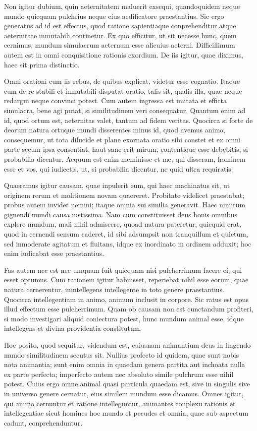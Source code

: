  Non igitur dubium, quin aeternitatem maluerit exsequi, quandoquidem neque mundo quicquam pulchrius neque eius aedificatore praestantius. Sic ergo generatus ad id est effectus, quod ratione sapientiaque conprehenditur atque aeternitate inmutabili continetur. Ex quo efficitur, ut sit necesse hunc, quem cernimus, mundum simulacrum aeternum esse alicuius aeterni. Difficillimum autem est in omni conquisitione rationis exordium. De iis igitur, quae diximus, haec sit prima distinctio.

 Omni orationi cum iis rebus, de quibus explicat, videtur esse cognatio. Itaque cum de re stabili et inmutabili disputat oratio, talis sit, qualis illa, quae neque redargui neque convinci potest. Cum autem ingressa est imitata et efficta simulacra, bene agi putat, si similitudinem veri consequatur. Quantum enim ad id, quod ortum est, aeternitas valet, tantum ad fidem veritas. Quocirca si forte de deorum natura ortuque mundi disserentes minus id, quod avemus animo, consequemur, ut tota dilucide et plane exornata oratio sibi constet et ex omni parte secum ipsa consentiat, haut sane erit mirum, contentique esse debebitis, si probabilia dicentur. Aequum est enim meminisse et me, qui disseram, hominem esse et vos, qui iudicetis, ut, si probabilia dicentur, ne quid ultra requiratis.

 Quaeramus igitur causam, quae inpulerit eum, qui haec machinatus sit, ut originem rerum et molitionem novam quaereret. Probitate videlicet praestabat; probus autem invidet nemini; itaque omnia sui similia generavit. Haec nimirum gignendi mundi causa iustissima. Nam cum constituisset deus bonis omnibus explere mundum, mali nihil admiscere, quoad natura pateretur, quicquid erat, quod in cernendi sensum caderet, id sibi adsumpsit non tranquillum et quietum, sed inmoderate agitatum et fluitans, idque ex inordinato in ordinem adduxit; hoc enim iudicabat esse praestantius.

 Fas autem nec est nec umquam fuit quicquam nisi pulcherrimum facere ei, qui esset optumus. Cum rationem igitur habuisset, reperiebat nihil esse eorum, quae natura cernerentur, inintellegens intellegente in toto genere praestantius. Quocirca intellegentiam in animo, animum inclusit in corpore. Sic ratus est opus illud effectum esse pulcherrimum. Quam ob causam non est cunctandum profiteri, si modo investigari aliquid coniectura potest, hunc mundum animal esse, idque intellegens et divina providentia constitutum.

 Hoc posito, quod sequitur, videndum est, cuiusnam animantium deus in fingendo mundo similitudinem secutus sit. Nullius profecto id quidem, quae sunt nobis nota animantia; sunt enim omnia in quaedam genera partita aut inchoata nulla ex parte perfecta; imperfecto autem nec absoluto simile pulchrum esse nihil potest. Cuius ergo omne animal quasi particula quaedam est, sive in singulis sive in universo genere cernatur, eius similem mundum esse dicamus. Omnes igitur, qui animo cernuntur et ratione intelleguntur, animantes conplexu rationis et intellegentiae sicut homines hoc mundo et pecudes et omnia, quae sub aspectum cadunt, conprehenduntur.

